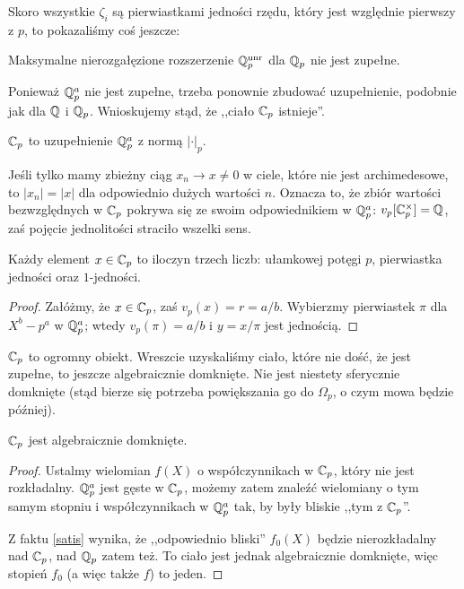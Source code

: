 Skoro wszystkie $\zeta_i$ są pierwiastkami jedności rzędu, który jest względnie pierwszy z $p$, to pokazaliśmy coś jeszcze:

\begin{fakt}
	Maksymalne nierozgałęzione rozszerzenie $\mathbb Q_p^{\textrm{unr}}$ dla $\mathbb Q_p$ nie jest zupełne.
\end{fakt}

Ponieważ $\mathbb Q_p^a$ nie jest zupełne, trzeba ponownie zbudować uzupełnienie, podobnie jak dla $\mathbb Q$ i $\mathbb Q_p$.
Wnioskujemy stąd, że ,,ciało $\mathbb C_p$ istnieje''.

\begin{definicja}
	$\mathbb C_p$ to uzupełnienie $\mathbb Q_p^a$ z normą $|\cdot|_p$.
\end{definicja}

Jeśli tylko mamy zbieżny ciąg $x_n \to x \neq 0$ w ciele, które nie jest archimedesowe, to $|x_n| = |x|$ dla odpowiednio dużych wartości $n$.
Oznacza to, że zbiór wartości bezwzględnych w $\mathbb C_p$ pokrywa się ze swoim odpowiednikiem w $\mathbb Q_p^a$: $v_p[\mathbb C_p^\times] = \mathbb Q$, zaś pojęcie jednolitości straciło wszelki sens.

\begin{fakt}
	Każdy element $x \in \mathbb C_p$ to iloczyn trzech liczb: ułamkowej potęgi $p$, pierwiastka jedności oraz $1$-jedności.
\end{fakt}

\begin{proof}
	Załóżmy, że $x \in \mathbb C_p$, zaś $v_p(x) = r = a/b$.
	Wybierzmy pierwiastek $\pi$ dla $X^b - p^a$ w $\mathbb Q_p^a$; wtedy $v_p(\pi)= a/b$ i $y = x/ \pi$ jest jednością.
\end{proof}

$\mathbb C_p$ to ogromny obiekt.
Wreszcie uzyskaliśmy ciało, które nie dość, że jest zupełne, to jeszcze algebraicznie domknięte.
Nie jest niestety sferycznie domknięte (stąd bierze się 	potrzeba powiększania go do $\Omega_p$, o czym mowa będzie później).

\begin{fakt}
	$\mathbb C_p$ jest algebraicznie domknięte.
\end{fakt}

\begin{proof}
	Ustalmy wielomian $f(X)$ o współczynnikach w $\mathbb C_p$, który nie jest rozkładalny.
	$\mathbb Q_p^a$ jest gęste w $\mathbb C_p$, możemy zatem znaleźć wielomiany o tym samym stopniu i współczynnikach w $\mathbb Q_p^a$ tak, by były bliskie ,,tym z $\mathbb C_p$''.
	
	Z faktu \ref{satis} wynika, że ,,odpowiednio bliski'' $f_0(X)$ będzie nierozkładalny nad $\mathbb C_p$, nad $\mathbb Q_p$ zatem też.
	To ciało jest jednak algebraicznie domknięte, więc stopień $f_0$ (a więc także $f$) to jeden.
\end{proof}

